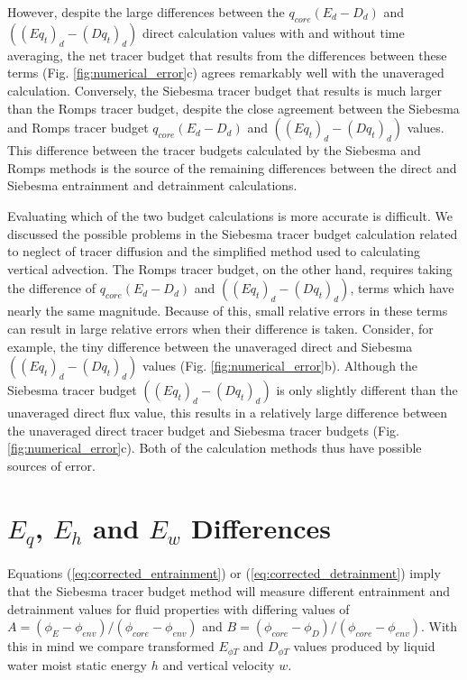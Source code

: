 \documentclass[12pt]{article}
\begin{document}
However, despite the large differences between the $q_{core}(E_d - D_d)$
and $((Eq_t)_d - (Dq_t)_d)$ direct calculation values with and without
time averaging, the net tracer budget that results from the differences 
between these terms (Fig. \ref{fig:numerical_error}c) agrees remarkably 
well with the unaveraged calculation.  Conversely, the Siebesma tracer 
budget that results is much larger than the Romps tracer budget, despite 
the close agreement between the Siebesma and Romps tracer budget 
$q_{core}(E_d - D_d)$ and $((Eq_t)_d - (Dq_t)_d)$ values.  This difference
between the tracer budgets calculated by the Siebesma and Romps methods is 
the source of the remaining differences between the direct and Siebesma
entrainment and detrainment calculations.

Evaluating which of the two budget calculations is more accurate is difficult.
We discussed the possible problems in the Siebesma tracer budget
calculation related to neglect of tracer diffusion and the simplified method 
used to calculating vertical advection.  The Romps tracer budget, on the 
other hand, requires taking the difference of $q_{core}(E_d - D_d)$
and $((Eq_t)_d - (Dq_t)_d)$, terms which have nearly the same magnitude.  
Because of this, small relative errors in these terms can result in large 
relative errors when their difference is taken.  Consider, for example, the 
tiny difference between the unaveraged direct and Siebesma 
$((Eq_t)_d - (Dq_t)_d)$ values (Fig. \ref{fig:numerical_error}b).  Although
the Siebesma tracer budget $((Eq_t)_d - (Dq_t)_d)$ is only slightly different
than the unaveraged direct flux value, this results in a relatively large 
difference between the unaveraged direct tracer budget and Siebesma tracer
budgets (Fig. \ref{fig:numerical_error}c).  Both of the calculation methods
thus have possible sources of error.


\section{$E_q$, $E_h$ and $E_w$ Differences}

Equations (\ref{eq:corrected_entrainment}) or (\ref{eq:corrected_detrainment}) 
imply that the Siebesma tracer budget method will measure different entrainment
and detrainment values for fluid properties with differing values of 
$A = (\phi_E - \phi_{env})/(\phi_{core} - \phi_{env})$ and
$B = (\phi_{core} - \phi_D)/(\phi_{core} - \phi_{env})$.  With this in mind 
we compare transformed $E_{\phi T}$ and $D_{\phi T}$ values produced by liquid
water moist static energy $h$ and vertical velocity $w$.
\end{document}
